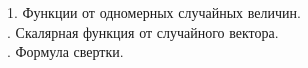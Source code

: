 
1. Функции от одномерных случайных величин. \\


. Скалярная функция от случайного вектора. \\


. Формула свертки. \\

